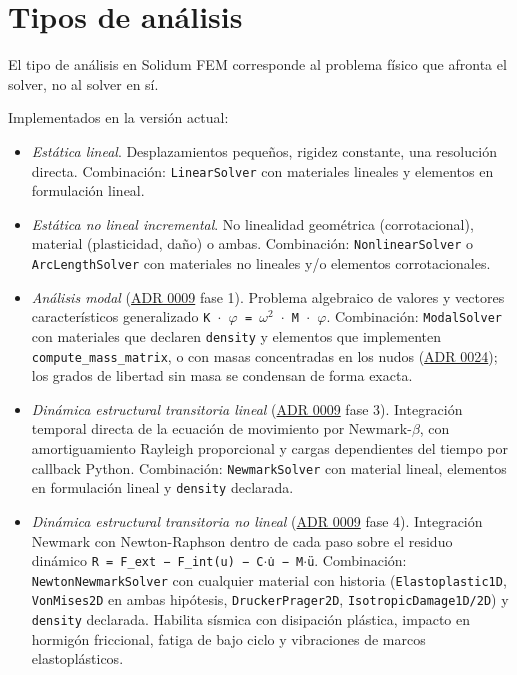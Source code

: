 \documentclass[11pt,oneside]{report}
\begin{document}
\section{Tipos de análisis}

El tipo de análisis en Solidum FEM corresponde al problema físico que afronta el solver, no al solver en sí.

Implementados en la versión actual:

\begin{itemize}
  \item \textit{Estática lineal}. Desplazamientos pequeños, rigidez constante, una resolución directa. Combinación: \texttt{LinearSolver} con materiales lineales y elementos en formulación lineal.
  \item \textit{Estática no lineal incremental}. No linealidad geométrica (corrotacional), material (plasticidad, daño) o ambas. Combinación: \texttt{NonlinearSolver} o \texttt{ArcLengthSolver} con materiales no lineales y/o elementos corrotacionales.
  \item \textit{Análisis modal} (\hyperref[adr:0009]{ADR 0009} fase 1). Problema algebraico de valores y vectores característicos generalizado \texttt{K \ensuremath{\cdot} \ensuremath{\varphi} = \ensuremath{\omega}\ensuremath{^{2}} \ensuremath{\cdot} M \ensuremath{\cdot} \ensuremath{\varphi}}. Combinación: \texttt{ModalSolver} con materiales que declaren \texttt{density} y elementos que implementen \texttt{compute\_\allowbreak{}mass\_\allowbreak{}matrix}, o con masas concentradas en los nudos (\hyperref[adr:0024]{ADR 0024}); los grados de libertad sin masa se condensan de forma exacta.
  \item \textit{Dinámica estructural transitoria lineal} (\hyperref[adr:0009]{ADR 0009} fase 3). Integración temporal directa de la ecuación de movimiento por Newmark-\ensuremath{\beta}, con amortiguamiento Rayleigh proporcional y cargas dependientes del tiempo por callback Python. Combinación: \texttt{NewmarkSolver} con material lineal, elementos en formulación lineal y \texttt{density} declarada.
  \item \textit{Dinámica estructural transitoria no lineal} (\hyperref[adr:0009]{ADR 0009} fase 4). Integración Newmark con Newton-Raphson dentro de cada paso sobre el residuo dinámico \texttt{R = F\_\allowbreak{}ext − F\_\allowbreak{}int(u) − C\ensuremath{\cdot}u̇ − M\ensuremath{\cdot}ü}. Combinación: \texttt{NewtonNewmarkSolver} con cualquier material con historia (\texttt{Elastoplastic1D}, \texttt{VonMises2D} en ambas hipótesis, \texttt{DruckerPrager2D}, \texttt{IsotropicDamage1D/\allowbreak{}2D}) y \texttt{density} declarada. Habilita sísmica con disipación plástica, impacto en hormigón friccional, fatiga de bajo ciclo y vibraciones de marcos elastoplásticos.

\end{itemize}
\end{document}
